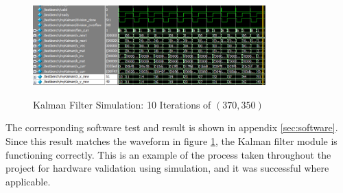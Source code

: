 \documentclass[11pt]{article} %
\begin{document}
\begin{figure}[h]
\centering
\caption{Kalman Filter Simulation: 10 Iterations of $(370,350)$}
\includegraphics[width=0.8\textwidth]{./images/kalman_sim.jpg}
\label{fig:wave}
\end{figure}
The corresponding software test and result is shown in appendix \ref{sec:software}. Since this result matches the waveform in figure \ref{fig:wave}, the Kalman filter module is functioning correctly. This is an example of the process taken throughout the project for hardware validation using simulation, and it was successful where applicable.
\end{document}
